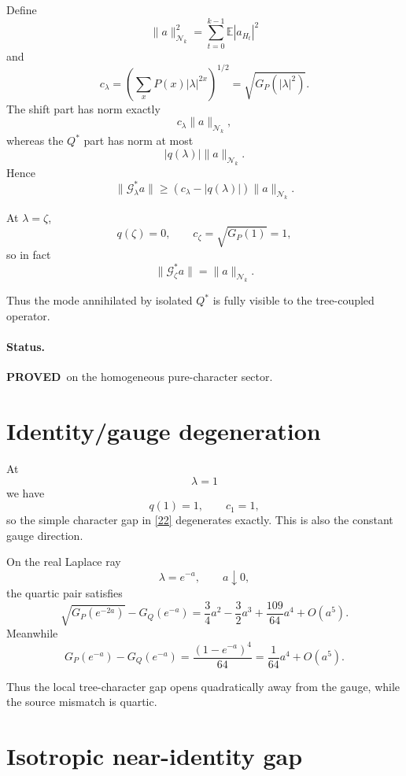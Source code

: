 \documentclass[11pt,a4paper]{article}
\newcommand{\Gcal}{\mathcal G}
\newcommand{\Ncal}{\mathcal N}
\newcommand{\E}{\mathbb E}
\newcommand{\PROVED}{\textcolor{green!45!black}{\textbf{PROVED}}}
\begin{document}
Define
\[
\|a\|_{\Ncal_k}^2
=
\sum_{t=0}^{k-1}
\E|a_{H_t}|^2
\]
and
\[
c_\lambda
=
\left(
\sum_xP(x)|\lambda|^{2x}
\right)^{1/2}
=
\sqrt{G_P(|\lambda|^2)}.
\]
The shift part has norm exactly
\[
c_\lambda\|a\|_{\Ncal_k},
\]
whereas the \(Q^*\) part has norm at most
\[
|q(\lambda)|\|a\|_{\Ncal_k}.
\]
Hence
\begin{equation}
\boxed{
\|\Gcal_\lambda^*a\|
\ge
\left(
c_\lambda-|q(\lambda)|
\right)
\|a\|_{\Ncal_k}.
}
\tag{22}
\end{equation}

At \(\lambda=\zeta\),
\[
q(\zeta)=0,
\qquad
c_\zeta=\sqrt{G_P(1)}=1,
\]
so in fact
\[
\boxed{
\|\Gcal_\zeta^*a\|
=
\|a\|_{\Ncal_k}.
}
\tag{23}
\]

Thus the mode annihilated by isolated \(Q^*\) is fully visible to the
tree-coupled operator.

\paragraph{Status.}
\PROVED\ on the homogeneous pure-character sector.

\section{Identity/gauge degeneration}

At
\[
\lambda=1
\]
we have
\[
q(1)=1,
\qquad
c_1=1,
\]
so the simple character gap in \eqref{22} degenerates exactly.
This is also the constant gauge direction.

On the real Laplace ray
\[
\lambda=e^{-a},
\qquad
a\downarrow0,
\]
the quartic pair satisfies
\begin{equation}
\boxed{
\sqrt{G_P(e^{-2a})}
-
G_Q(e^{-a})
=
\frac34a^2
-\frac32a^3
+\frac{109}{64}a^4
+O(a^5).
}
\tag{24}
\end{equation}
Meanwhile
\[
\boxed{
G_P(e^{-a})-G_Q(e^{-a})
=
\frac{(1-e^{-a})^4}{64}
=
\frac1{64}a^4+O(a^5).
}
\tag{25}
\]

Thus the local tree-character gap opens quadratically away from the gauge,
while the source mismatch is quartic.

\section{Isotropic near-identity gap}
\end{document}
